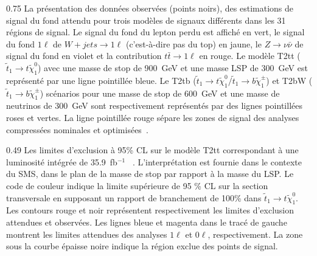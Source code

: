                  {0.75}       %
                 {La présentation des données observées (points noirs), des estimations de signal du fond attendu pour trois modèles de signaux différents dans les 31 régions de signal. Le signal du fond  du lepton perdu est affiché en vert, le signal du fond  $ 1 \ell $ de $ W + jets \to 1 \ell $ (c'est-à-dire pas du top) en jaune, le $ Z \to \nu \bar {\nu} $ de signal du fond  en violet et la contribution $ t \bar {t} \to 1 \ell $ en rouge. Le modèle T2tt ($ \tilde{t}_{1} \to t \tilde {\chi}^{0}_{1} $) avec une masse de stop de 900~GeV et une masse LSP de 300~GeV est représenté par une ligne pointillée bleue. Le T2tb ($\tilde{t}_{1} \to t \tilde{\chi}^{0}_{1} /\tilde{t}_{1} \to b \tilde{\chi}^{\pm}_{1}$) et T2bW ($\tilde{t}_{1} \to b \tilde{\chi}^{\pm}_{1} $) scénarios pour une masse de stop de 600~GeV et une masse de neutrinos de 300~GeV sont respectivement représentés par des lignes pointillées roses et vertes. La ligne pointillée rouge sépare les zones de signal des analyses compressées nominales et optimisées~\cite{Sirunyan:2017xse}. }

                 {0.49}       %
                 {Les limites d'exclusion à 95\% CL sur le modèle T2tt correspondant à une luminosité intégrée de 35.9~fb$^{-1}$ ~\cite{Sirunyan:2017xse}. L'interprétation est fournie dans le contexte du SMS, dans le plan de la masse de stop par rapport à la masse du LSP. Le code de couleur indique la limite supérieure de 95 \% CL sur la section transversale en supposant un rapport de branchement de 100\% dans $ \tilde {t}_{1} \to t \tilde{\chi}^{0}_{1} $. Les contours rouge et noir représentent respectivement les limites d'exclusion attendues et observées. Les lignes bleue et magenta dans le tracé de gauche montrent les limites attendues des analyses $ 1 \ell $ et $ 0 \ell $, respectivement. La zone sous la courbe épaisse noire indique la région exclue des points de signal. }

